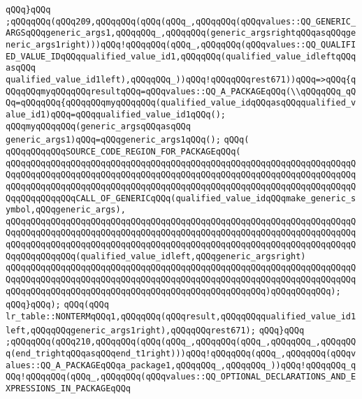 \verb|qQQq}qQQq|\newline
\verb|;qQQqqQQq(qQQq209,qQQqqQQq(qQQq(qQQq_,qQQqqQQq(qQQqvalues::QQ_GENERIC_ARGSqQQqgeneric_args1,qQQqqQQq_,qQQqqQQq(generic_argsrightqQQqasqQQqgeneric_args1right)))qQQq!qQQqqQQq(qQQq_,qQQqqQQq(qQQqvalues::QQ_QUALIFIED_VALUE_IDqQQqqualified_value_id1,qQQqqQQq(qualified_value_idleftqQQqasqQQq|\newline
\verb|qualified_value_id1left),qQQqqQQq_))qQQq!qQQqqQQqrest671))qQQq=>qQQq{qQQqqQQqmyqQQqqQQqresultqQQq=qQQqvalues::QQ_A_PACKAGEqQQq(\\qQQqqQQq_qQQq=qQQqqQQq{qQQqqQQqmyqQQqqQQq(qualified_value_idqQQqasqQQqqualified_value_id1)qQQq=qQQqqualified_value_id1qQQq();|\newline
\verb|qQQqmyqQQqqQQq(generic_argsqQQqasqQQq|\newline
\verb|generic_args1)qQQq=qQQqgeneric_args1qQQq();|\newline
\verb|qQQq(|\newline
\verb|qQQqqQQqqQQqSOURCE_CODE_REGION_FOR_PACKAGEqQQq(|\newline
\verb|qQQqqQQqqQQqqQQqqQQqqQQqqQQqqQQqqQQqqQQqqQQqqQQqqQQqqQQqqQQqqQQqqQQqqQQqqQQqqQQqqQQqqQQqqQQqqQQqqQQqqQQqqQQqqQQqqQQqqQQqqQQqqQQqqQQqqQQqqQQqqQQqqQQqqQQqqQQqqQQqqQQqqQQqqQQqqQQqqQQqqQQqqQQqqQQqqQQqqQQqqQQqqQQqqQQqqQQqqQQqqQQqCALL_OF_GENERICqQQq(qualified_value_idqQQqmake_generic_symbol,qQQqgeneric_args),|\newline
\verb|qQQqqQQqqQQqqQQqqQQqqQQqqQQqqQQqqQQqqQQqqQQqqQQqqQQqqQQqqQQqqQQqqQQqqQQqqQQqqQQqqQQqqQQqqQQqqQQqqQQqqQQqqQQqqQQqqQQqqQQqqQQqqQQqqQQqqQQqqQQqqQQqqQQqqQQqqQQqqQQqqQQqqQQqqQQqqQQqqQQqqQQqqQQqqQQqqQQqqQQqqQQqqQQqqQQqqQQqqQQqqQQq(qualified_value_idleft,qQQqgeneric_argsright)|\newline
\verb|qQQqqQQqqQQqqQQqqQQqqQQqqQQqqQQqqQQqqQQqqQQqqQQqqQQqqQQqqQQqqQQqqQQqqQQqqQQqqQQqqQQqqQQqqQQqqQQqqQQqqQQqqQQqqQQqqQQqqQQqqQQqqQQqqQQqqQQqqQQqqQQqqQQqqQQqqQQqqQQqqQQqqQQqqQQqqQQqqQQqqQQqqQQqqQQq)qQQqqQQqqQQq);|\newline
\verb|qQQq}qQQq);|\newline
\verb|qQQq(qQQq|\newline
\verb|lr_table::NONTERMqQQq1,qQQqqQQq(qQQqresult,qQQqqQQqqualified_value_id1left,qQQqqQQqgeneric_args1right),qQQqqQQqrest671);|\newline
\verb|qQQq}qQQq|\newline
\verb|;qQQqqQQq(qQQq210,qQQqqQQq(qQQq(qQQq_,qQQqqQQq(qQQq_,qQQqqQQq_,qQQqqQQq(end_trightqQQqasqQQqend_t1right)))qQQq!qQQqqQQq(qQQq_,qQQqqQQq(qQQqvalues::QQ_A_PACKAGEqQQqa_package1,qQQqqQQq_,qQQqqQQq_))qQQq!qQQqqQQq_qQQq!qQQqqQQq(qQQq_,qQQqqQQq(qQQqvalues::QQ_OPTIONAL_DECLARATIONS_AND_EXPRESSIONS_IN_PACKAGEqQQq|\newline
